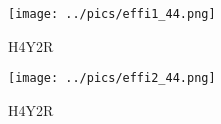 \documentclass[10pt, xcolor={dvipsnames}, aspectratio = 169]{beamer}
\begin{document}
\begin{frame}

\begin{figure}
\centering
\texttt{[image: ../pics/effi1\_44.png]}
\caption{H4Y2R}
\end{figure}

\end{frame}

\begin{frame}

\begin{figure}
\centering
\texttt{[image: ../pics/effi2\_44.png]}
\caption{H4Y2R}
\end{figure}

\end{frame}
\end{document}
